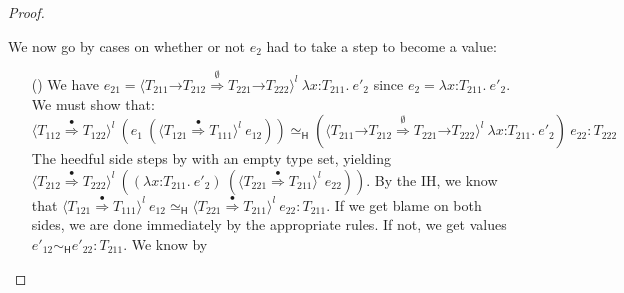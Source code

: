 \documentclass[9pt]{extarticle}
\newcommand{\ottnt}[1]{\mathit{#1}}
\newcommand{\ottsym}[1]{#1}
\begin{document}
{\begin{lemma}
\begin{proof}
{\begin{itemize}
      We now go by cases on whether or not $\ottnt{e_{{\mathrm{2}}}}$ had to take a step
      to become a value:
\begin{itemize}
      \item[(\V{ProxyH})] We have $\ottnt{e_{{\mathrm{21}}}}  \ottsym{=}   \langle   \ottnt{T_{{\mathrm{211}}}} \mathord{ \rightarrow } \ottnt{T_{{\mathrm{212}}}}   \mathord{ \overset{ \emptyset }{\Rightarrow} }   \ottnt{T_{{\mathrm{221}}}} \mathord{ \rightarrow } \ottnt{T_{{\mathrm{222}}}}   \rangle^{ \ottnt{l} } ~   \lambda \mathit{x} \mathord{:} \ottnt{T_{{\mathrm{211}}}} .~  \ottnt{e'_{{\mathrm{2}}}}  $ since $\ottnt{e_{{\mathrm{2}}}}  \ottsym{=}   \lambda \mathit{x} \mathord{:} \ottnt{T_{{\mathrm{211}}}} .~  \ottnt{e'_{{\mathrm{2}}}} $. We must show that:
\[   \langle  \ottnt{T_{{\mathrm{112}}}}  \mathord{ \overset{\bullet}{\Rightarrow} }  \ottnt{T_{{\mathrm{122}}}}  \rangle^{ \ottnt{l} } ~   (  \ottnt{e_{{\mathrm{1}}}} ~  (  \langle  \ottnt{T_{{\mathrm{121}}}}  \mathord{ \overset{\bullet}{\Rightarrow} }  \ottnt{T_{{\mathrm{111}}}}  \rangle^{ \ottnt{l} } ~  \ottnt{e_{{\mathrm{12}}}}  )   )     \simeq _{  \mathsf{H}  }    (  \langle   \ottnt{T_{{\mathrm{211}}}} \mathord{ \rightarrow } \ottnt{T_{{\mathrm{212}}}}   \mathord{ \overset{ \emptyset }{\Rightarrow} }   \ottnt{T_{{\mathrm{221}}}} \mathord{ \rightarrow } \ottnt{T_{{\mathrm{222}}}}   \rangle^{ \ottnt{l} } ~   \lambda \mathit{x} \mathord{:} \ottnt{T_{{\mathrm{211}}}} .~  \ottnt{e'_{{\mathrm{2}}}}   )  ~ \ottnt{e_{{\mathrm{22}}}}   :  \ottnt{T_{{\mathrm{222}}}}  \]
The heedful side steps by  with an empty type set,
        yielding $ \langle  \ottnt{T_{{\mathrm{212}}}}  \mathord{ \overset{\bullet}{\Rightarrow} }  \ottnt{T_{{\mathrm{222}}}}  \rangle^{ \ottnt{l} } ~   (   (  \lambda \mathit{x} \mathord{:} \ottnt{T_{{\mathrm{211}}}} .~  \ottnt{e'_{{\mathrm{2}}}}  )  ~  (  \langle  \ottnt{T_{{\mathrm{221}}}}  \mathord{ \overset{\bullet}{\Rightarrow} }  \ottnt{T_{{\mathrm{211}}}}  \rangle^{ \ottnt{l} } ~  \ottnt{e_{{\mathrm{22}}}}  )   )  $.
By the IH, we know that $  \langle  \ottnt{T_{{\mathrm{121}}}}  \mathord{ \overset{\bullet}{\Rightarrow} }  \ottnt{T_{{\mathrm{111}}}}  \rangle^{ \ottnt{l} } ~  \ottnt{e_{{\mathrm{12}}}}    \simeq _{  \mathsf{H}  }   \langle  \ottnt{T_{{\mathrm{221}}}}  \mathord{ \overset{\bullet}{\Rightarrow} }  \ottnt{T_{{\mathrm{211}}}}  \rangle^{ \ottnt{l} } ~  \ottnt{e_{{\mathrm{22}}}}   :  \ottnt{T_{{\mathrm{211}}}} $. 
If we get blame on both sides, we are done immediately by the
        appropriate  rules.
If not, we get values $ \ottnt{e'_{{\mathrm{12}}}}   \sim _{  \mathsf{H}  }  \ottnt{e'_{{\mathrm{22}}}}  :  \ottnt{T_{{\mathrm{211}}}} $. We know by

\end{itemize}
\end{itemize}}
\end{proof}
\end{lemma}}
\end{document}
